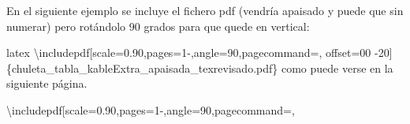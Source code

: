 \documentclass[11pt,a4paper,oneside,]{article}
\newenvironment{Shaded}{\begin{snugshade}}{\end{snugshade}}
\newcommand{\AttributeTok}[1]{\textcolor[rgb]{0.77,0.63,0.00}{#1}}
\newcommand{\DecValTok}[1]{\textcolor[rgb]{0.00,0.00,0.81}{#1}}
\newcommand{\FloatTok}[1]{\textcolor[rgb]{0.00,0.00,0.81}{#1}}
\newcommand{\FunctionTok}[1]{\textcolor[rgb]{0.00,0.00,0.00}{#1}}
\newcommand{\NormalTok}[1]{#1}
\newcommand{\SpecialCharTok}[1]{\textcolor[rgb]{0.00,0.00,0.00}{#1}}
\newcommand{\StringTok}[1]{\textcolor[rgb]{0.31,0.60,0.02}{#1}}
\numberwithin{dummy}{section}
\theoremstyle{ocrenumbox}
\theoremstyle{blacknumex}
\theoremstyle{blacknumbox}
\theoremstyle{ocrenum}
\theoremstyle{ocrenum}
\begin{document}
\begin{Shaded}
\begin{Highlighting}[numbers=left,,firstnumber=1101,]
\NormalTok{En el siguiente ejemplo se incluye el fichero }\FunctionTok{pdf}\NormalTok{ (vendría apaisado y puede que sin numerar) pero rotándolo }\DecValTok{90}\NormalTok{ grados para que quede en vertical}\SpecialCharTok{:}

\StringTok{\textasciigrave{}\textasciigrave{}\textasciigrave{}}\AttributeTok{latex}
\AttributeTok{\textbackslash{}includepdf[scale=0.90,pages=1{-},angle=90,pagecommand=,}
\AttributeTok{offset=00 {-}20]\{chuleta\_tabla\_kableExtra\_apaisada\_texrevisado.pdf\}}
\StringTok{\textasciigrave{}\textasciigrave{}\textasciigrave{}}
\NormalTok{como puede verse en la siguiente página.}

\NormalTok{\textbackslash{}includepdf[}\AttributeTok{scale=}\FloatTok{0.90}\NormalTok{,}\AttributeTok{pages=}\DecValTok{1}\SpecialCharTok{{-}}\NormalTok{,}\AttributeTok{angle=}\DecValTok{90}\NormalTok{,}\AttributeTok{pagecommand=}\NormalTok{,}
\end{Highlighting}
\end{Shaded}
\end{document}
